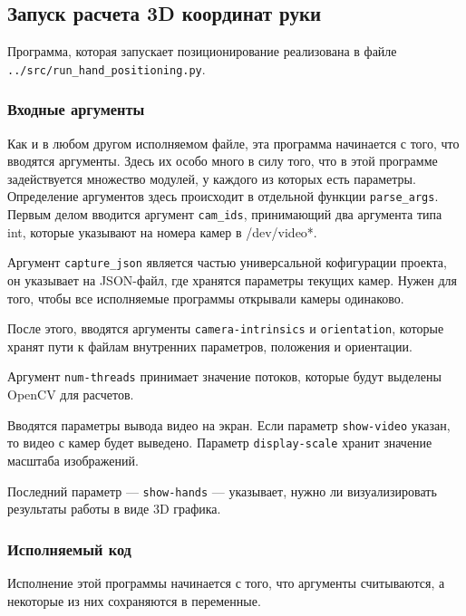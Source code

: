 \documentclass[12pt, a4paper]{article}
\begin{document}
\subsection{Запуск расчета 3D координат руки}
Программа, которая запускает позиционирование реализована в файле
\texttt{../src/run\_hand\_positioning.py}.

\subsubsection{Входные аргументы}
Как и в любом другом исполняемом файле, эта программа начинается с того, что
вводятся аргументы. Здесь их особо много в силу того, что в этой программе
задействуется множество модулей, у каждого из которых есть параметры.
Определение аргументов здесь происходит в отдельной функции
\texttt{parse\_args}.
Первым делом вводится аргумент \texttt{cam\_ids}, принимающий два аргумента
типа int, которые указывают на номера камер в /dev/video*.

Аргумент \texttt{capture\_json} является частью универсальной кофигурации
проекта, он указывает на JSON-файл, где хранятся параметры текущих камер. Нужен
для того, чтобы все исполняемые программы открывали камеры одинаково.

После этого, вводятся аргументы \texttt{camera-intrinsics} и
\texttt{orientation}, которые хранят пути к файлам внутренних параметров,
положения и ориентации.

Аргумент \texttt{num-threads} принимает значение потоков, которые будут
выделены OpenCV для расчетов.

Вводятся параметры вывода видео на экран. Если параметр \texttt{show-video}
указан, то видео с камер будет выведено. Параметр \texttt{display-scale} хранит
значение масштаба изображений. 

Последний параметр --- \texttt{show-hands} --- указывает, нужно ли
визуализировать результаты работы в виде 3D графика.

\subsubsection{Исполняемый код}
Исполнение этой программы начинается с того, что аргументы считываются, а
некоторые из них сохраняются в переменные.
\end{document}
